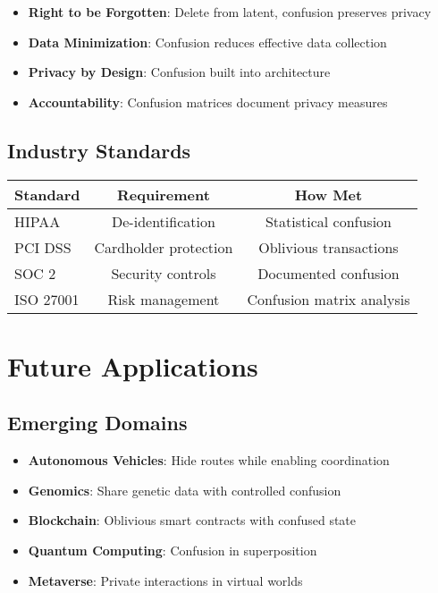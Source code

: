 \documentclass[11pt,final]{article}
\begin{document}
\begin{itemize}
    \item \textbf{Right to be Forgotten}: Delete from latent, confusion preserves privacy
    \item \textbf{Data Minimization}: Confusion reduces effective data collection
    \item \textbf{Privacy by Design}: Confusion built into architecture
    \item \textbf{Accountability}: Confusion matrices document privacy measures
\end{itemize}

\subsection{Industry Standards}

\begin{center}
\begin{tabular}{lcc}
\toprule
\textbf{Standard} & \textbf{Requirement} & \textbf{How Met} \\
\midrule
HIPAA & De-identification & Statistical confusion \\
PCI DSS & Cardholder protection & Oblivious transactions \\
SOC 2 & Security controls & Documented confusion \\
ISO 27001 & Risk management & Confusion matrix analysis \\
\bottomrule
\end{tabular}
\end{center}

\section{Future Applications}

\subsection{Emerging Domains}

\begin{itemize}
    \item \textbf{Autonomous Vehicles}: Hide routes while enabling coordination
    \item \textbf{Genomics}: Share genetic data with controlled confusion
    \item \textbf{Blockchain}: Oblivious smart contracts with confused state
    \item \textbf{Quantum Computing}: Confusion in superposition
    \item \textbf{Metaverse}: Private interactions in virtual worlds
\end{itemize}
\end{document}
